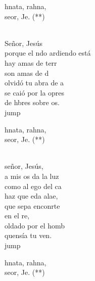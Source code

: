 \begin{cancion}[Marahnata][Nico]%
	\begin{chorus}%
	hnata, rahna,\\
	 seor, Je. (**)\\
	\end{chorus}%
	\jump\\
	 Señor, Jesús\\
	porque el ndo ardiendo está\\
	hay amas de terr\\
	son amas de d\\
	 olvidó tu abra de a\\
	se caió por la opres\\
	de hbres sobre os.\\jump\\
	\begin{chorus}%
	hnata, rahna,\\
	 seor, Je. (**)\\
	\end{chorus}%
	\jump\\
	 señor, Jesús,\\
	a mis os da la luz\\
	como al ego del ca\\
	haz que eda alae,\\
	que sepa enconrte\\
	en el re,\\
	oldado por el homb\\
	quensía tu ven.\\jump\\
	\begin{chorus}%
	hnata, rahna,\\
	 seor, Je. (**)\\
	\end{chorus}%
	\jump\\
\end{cancion}%
